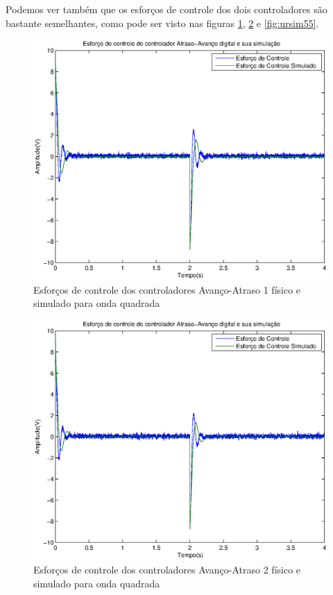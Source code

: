 \documentclass{article}
\begin{document}
Podemos ver também que os esforços de controle dos dois controladores são bastante semelhantes, como pode ser visto nas figuras \ref{fig:ursim45}, \ref{fig:ursim50} e \ref{fig:ursim55}.
\begin{figure}[H]
	\centering
	\includegraphics[width=0.8\linewidth]{ursim45}
	\caption{Esforços de controle dos controladores Avanço-Atraso 1 físico e simulado para onda quadrada}
	\label{fig:ursim45}
\end{figure}
\begin{figure}[H]
	\centering
	\includegraphics[width=0.8\linewidth]{ursim50}
	\caption{Esforços de controle dos controladores Avanço-Atraso 2 físico e simulado para onda quadrada}
	\label{fig:ursim50}
\end{figure}
\end{document}
